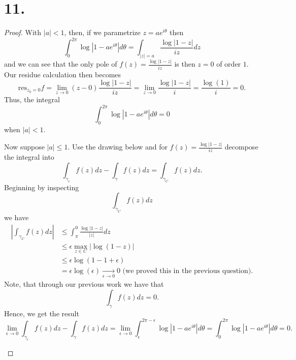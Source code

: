 \documentclass{article}
\begin{document}
\section*{11.}
\begin{proof}
 With $|a| < 1$, then, if we parametrize $z = ae^{i \theta}$ then
 \[
 \int_0^{2 \pi}\log\left|1 - ae^{i \theta}\right|d \theta = \int_{|z| = a}\frac{\log|1 - z|}{iz}dz 
 \]
 and we can see that the only pole of $f(z) = \frac{\log|1 - z|}{iz}$ is then $z = 0$ of order $1$. Our residue calculation then becomes
 \[
 \text{res}_{z_0 = 0}f = \lim\limits_{z \to 0} (z - 0) \frac{\log|1 - z|}{iz} = \lim\limits_{z \to 0} \frac{\log|1 - z|}{i} = \frac{\log(1)}{i} = 0.
 \]
 Thus, the integral 
 \[
 \int_0^{2 \pi } \log\left|1 - ae^{i \theta}\right| d\theta = 0 
 \]
 when $|a| < 1$. 

 Now suppose $|a| \leq 1$. Use the drawing below and for $f(z) = \frac{\log|1 - z|}{iz}$ decompose the integral into 
 \[
 \int_{\gamma_{\epsilon}}f(z)dz - \int_{\gamma}f(z)dz = \int_{\gamma_C} f(z)dz. 
 \]Beginning by inspecting 
 \[
 \int_{\gamma_C}f(z)dz 
 \] we have 
 \begin{align*}
 \left|\int_{\gamma_C} f(z) dz \right| &\leq \int_{\pi}^0 \frac{\log|1 - z|}{|z|}dz \\
 &\leq \epsilon \max\limits_{z \in C}|\log( 1- z)| \\
 &\leq \epsilon \log(1 - 1 + \epsilon)\\
 &= \epsilon \log(\epsilon) \xrightarrow[\epsilon \to 0]{} 0 \text{ (we proved this in the previous question)}.
 \end{align*}
Note, that through our previous work we have that 
\[
 \int_{\gamma}f(z) dz = 0. 
\]
Hence, we get the result 
\[
 \lim\limits_{\epsilon \to 0} \int_{\gamma_{\epsilon}} f(z)dz - \int_{\gamma}f(z)dz = \lim\limits_{\epsilon \to 0} \int_{\epsilon}^{2 \pi - \epsilon}\log\left|1 - ae^{i \theta}\right|d \theta = \int_0^{2 \pi}\log\left|1 - ae^{i \theta}\right|d \theta = 0.
\]
\begin{center}
  


\begin{tikzpicture}[x=0.5pt,y=0.5pt,yscale=-1,xscale=1]


\end{tikzpicture}
\end{center}
\end{proof}
\end{document}
